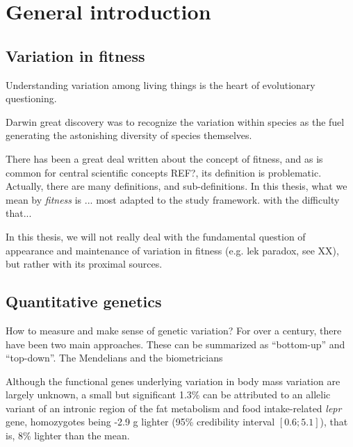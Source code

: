 
\chapter[Chapter 1: General introduction]{General introduction}

\section{Variation in fitness}
Understanding variation among living things is the heart of evolutionary questioning.


Darwin great discovery was to recognize the variation within species as the fuel generating the astonishing diversity of species themselves.

There has been a great deal written about the concept of fitness, and as is common for central scientific concepts REF?, its definition is problematic. Actually, there are many definitions, and sub-definitions. 
In this thesis, what we mean by \emph{fitness} is ...
most adapted to the study framework.
with the difficulty that... 


In this thesis, we will not really deal with the fundamental question of appearance and maintenance of variation in fitness (e.g. lek paradox, see XX), but rather with its proximal sources.

 
\section{Quantitative genetics}

How to measure and make sense of genetic variation?
For over a century, there have been two main approaches. 
These can be summarized as ``bottom-up'' and ``top-down''.
The Mendelians and the biometricians


Although the functional genes underlying variation in body mass variation are largely unknown, a small but significant 1.3\% can be attributed to an allelic variant of an intronic region of the fat metabolism and food intake-related \emph{lepr} gene, 
 homozygotes being -2.9 g lighter (95\% credibility interval $[0.6;5.1]$), that is, 8\% lighter than the mean. 

